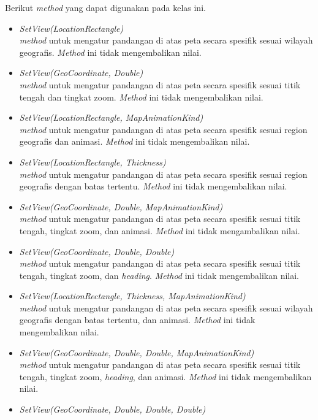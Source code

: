 \newpage
Berikut \textit{method} yang dapat digunakan pada kelas ini.
\begin{itemize}
	\item \textit{SetView(LocationRectangle)} \\
	\textit{method} untuk mengatur pandangan di atas peta secara spesifik sesuai wilayah geografis. \textit{Method} ini tidak mengembalikan nilai.
	\item \textit{SetView(GeoCoordinate, Double)} \\
	\textit{method} untuk mengatur pandangan di atas peta secara spesifik sesuai titik tengah dan tingkat zoom. \textit{Method} ini tidak mengembalikan nilai.
	\item \textit{SetView(LocationRectangle, MapAnimationKind)}\\
	\textit{method} untuk mengatur pandangan di atas peta secara spesifik sesuai region geografis dan animasi. \textit{Method} ini tidak mengembalikan nilai.
	\item \textit{SetView(LocationRectangle, Thickness)} \\
	\textit{method} untuk mengatur pandangan di atas peta secara spesifik sesuai region geografis dengan batas tertentu. \textit{Method} ini tidak mengembalikan nilai.
	\item \textit{SetView(GeoCoordinate, Double, MapAnimationKind)} \\
	\textit{method} untuk mengatur pandangan di atas peta secara spesifik sesuai titik tengah, tingkat zoom, dan animasi. \textit{Method} ini tidak mengambalikan nilai.
	\item \textit{SetView(GeoCoordinate, Double, Double)} \\
	\textit{method} untuk mengatur pandangan di atas peta secara spesifik sesuai titik tengah, tingkat zoom, dan \textit{heading}. \textit{Method} ini tidak mengembalikan nilai.
	\item \textit{SetView(LocationRectangle, Thickness, MapAnimationKind)} \\
	\textit{method} untuk mengatur pandangan di atas peta secara spesifik sesuai wilayah geografis dengan batas tertentu, dan animasi. \textit{Method} ini tidak mengembalikan nilai.
	\item \textit{SetView(GeoCoordinate, Double, Double, MapAnimationKind)} \\
	\textit{method} untuk mengatur pandangan di atas peta secara spesifik sesuai titik tengah, tingkat zoom, \textit{heading}, dan animasi. \textit{Method} ini tidak mengembalikan nilai.	
	\item \textit{SetView(GeoCoordinate, Double, Double, Double)} \\

\end{itemize}
